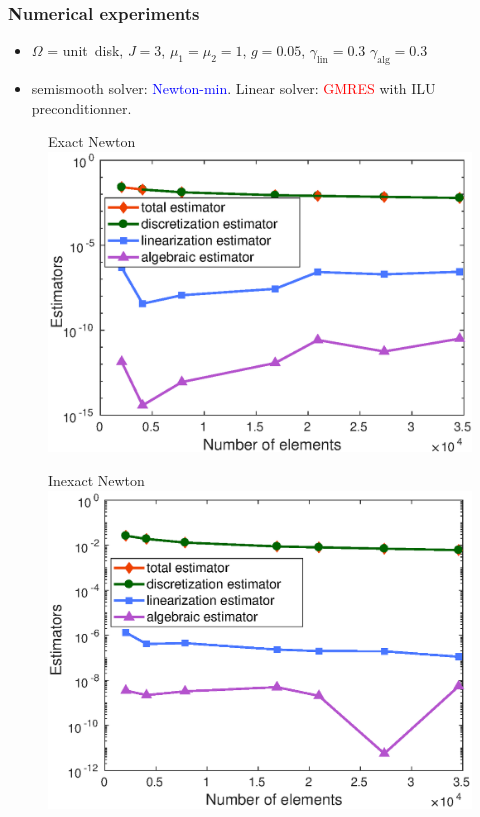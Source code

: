 \documentclass[aspectratio=169]{beamer}
\begin{document}
\begin{frame}
\frametitle{Numerical experiments}

\begin{itemize}
\item
$\Omega$ = \mbox{unit disk}, $J = 3$, $\mu_1= \mu_2 = 1$, $g = 0.05$, $\gamma_{\mathrm{lin}}=0.3$ $\gamma_{\mathrm{alg}}=0.3$
\item 
semismooth solver: \textcolor{blue}{Newton-min}. Linear solver: \textcolor{red}{GMRES} with ILU preconditionner.
\end{itemize}


\begin{figure}
\begin{minipage}[c]{.34\linewidth}
   \centering
   \quad Exact Newton
\includegraphics[width=\textwidth]{fig_article_chap_1/exact_resolution_convergence_estimator_number_elements.eps}    
\end{minipage}\hfill
\begin{minipage}[c]{.33\linewidth}
   \centering
   \quad Inexact Newton
\includegraphics[width=\textwidth]{fig_article_chap_1/inexact_resolution_convergence_estimator_number_elements.eps}    

\end{minipage}
\end{figure}
\end{frame}
\end{document}
